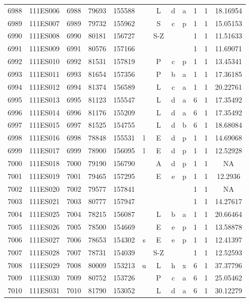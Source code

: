 \begin{tabular}{|*{12}{c|}}
6988 & 111ES006 & 6988 & 79693 & 155588 &  & L & d & a & 1 & 1 & 18.16954 \\ 
6989 & 111ES007 & 6989 & 79732 & 155962 &  & S & c & p & 1 & 1 & 15.05153 \\ 
6990 & 111ES008 & 6990 & 80181 & 156727 &  & S-Z &  &  & 1 & 1 & 11.51633 \\ 
6991 & 111ES009 & 6991 & 80576 & 157166 &  &  &  &  & 1 & 1 & 11.69071 \\ 
6992 & 111ES010 & 6992 & 81531 & 157819 &  & P & c & p & 1 & 1 & 13.45341 \\ 
6993 & 111ES011 & 6993 & 81654 & 157356 &  & P & b & a & 1 & 1 & 17.36185 \\ 
6994 & 111ES012 & 6994 & 81374 & 156589 &  & L & c & a & 1 & 1 & 20.22761 \\ 
6995 & 111ES013 & 6995 & 81123 & 155547 &  & L & d & a & 6 & 1 & 17.35492 \\ 
6996 & 111ES014 & 6996 & 81176 & 155209 &  & L & d & a & 6 & 1 & 17.35492 \\ 
6997 & 111ES015 & 6997 & 81525 & 154755 &  & L & d & b & 6 & 1 & 18.68084 \\ 
6998 & 111ES016 & 6998 & 78848 & 155531 & l & E & d & p & 1 & 1 & 14.69068 \\ 
6999 & 111ES017 & 6999 & 78900 & 156095 & l & E & d & p & 1 & 1 & 12.52928 \\ 
7000 & 111ES018 & 7000 & 79190 & 156790 &  & A & d & p & 1 & 1 & NA \\ 
7001 & 111ES019 & 7001 & 79465 & 157295 &  & E & e & p & 1 & 1 & 12.2936 \\ 
7002 & 111ES020 & 7002 & 79577 & 157841 &  &  &  &  & 1 & 1 & NA \\ 
7003 & 111ES021 & 7003 & 80777 & 157947 &  &  &  &  & 1 & 1 & 14.27617 \\ 
7004 & 111ES025 & 7004 & 78215 & 156087 &  & L & b & a & 1 & 1 & 20.66464 \\ 
7005 & 111ES026 & 7005 & 78500 & 154669 &  & E & e & p & 1 & 1 & 13.58878 \\ 
7006 & 111ES027 & 7006 & 78653 & 154302 & s & E & e & p & 1 & 1 & 12.41397 \\ 
7007 & 111ES028 & 7007 & 78731 & 154039 &  & S-Z &  &  & 1 & 1 & 12.52593 \\ 
7008 & 111ES029 & 7008 & 80009 & 153213 & u & L & h & x & 6 & 1 & 37.37796 \\ 
7009 & 111ES030 & 7009 & 80752 & 153726 &  & P & c & a & 6 & 1 & 25.05462 \\ 
7010 & 111ES031 & 7010 & 81790 & 153052 &  & L & d & a & 6 & 1 & 30.12279 \\ 

\end{tabular}
